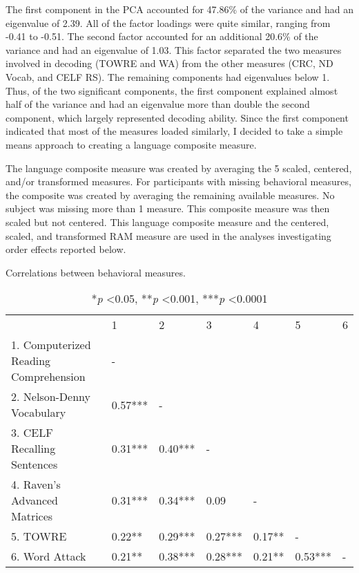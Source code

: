 \documentclass[../dissertation.tex]{subfiles}
\begin{document}
	The first component in the PCA accounted for 47.86\% of the variance and had an eigenvalue of 2.39. All of the factor loadings were quite similar, ranging from -0.41 to -0.51. The second factor accounted for an additional 20.6\% of the variance and had an eigenvalue of 1.03. This factor separated the two measures involved in decoding (TOWRE and WA) from the other measures (CRC, ND Vocab, and CELF RS). The remaining components had eigenvalues below 1. Thus, of the two significant components, the first component explained almost half of the variance and had an eigenvalue more than double the second component, which largely represented decoding ability. Since the first component indicated that most of the measures loaded similarly, I decided to take a simple means approach to creating a language composite measure. \par
	The language composite measure was created by averaging the 5 scaled, centered, and/or transformed measures. For participants with missing behavioral measures, the composite was created by averaging the remaining available measures. No subject was missing more than 1 measure. This composite measure was then scaled but not centered. This language composite measure and the centered, scaled, and transformed RAM measure are used in the analyses investigating order effects reported below.
	
\begin{table}[H]
\caption{Correlations between behavioral measures.}
\vspace{-10pt}
\begin{center}
\begin{tabular}{l|l|l|l|l|l|l}
                                      & 1       & 2       & 3       & 4      & 5       & 6 \\
1. Computerized Reading Comprehension & -       &         &         &        &         &   \\
2. Nelson-Denny Vocabulary            & 0.57*** & -       &         &        &         &   \\
3. CELF Recalling Sentences           & 0.31*** & 0.40*** & -       &        &         &   \\
4. Raven's Advanced Matrices          & 0.31*** & 0.34*** & 0.09    & -      &         &   \\
5. TOWRE                              & 0.22**  & 0.29*** & 0.27*** & 0.17** & -       &   \\
6. Word Attack                        & 0.21**  & 0.38*** & 0.28*** & 0.21** & 0.53*** & -
\end{tabular}
\label{exp1behcorr}
\end{center}
\vspace{-10pt}
\caption*{*\textit{p} \textless 0.05, **\textit{p} \textless 0.001, ***\textit{p} \textless 0.0001}
\end{table}
\end{document}
